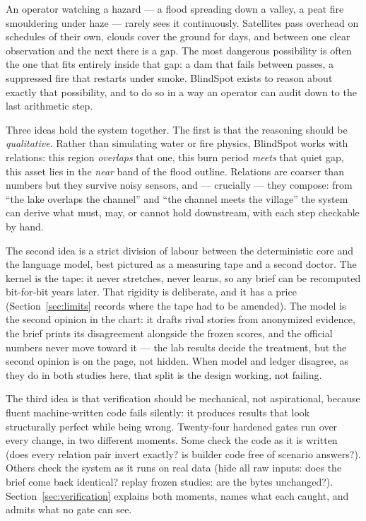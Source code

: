 \documentclass[11pt]{article}
\begin{document}
An operator watching a hazard --- a flood spreading down a valley, a peat fire
smouldering under haze --- rarely sees it continuously. Satellites pass
overhead on schedules of their own, clouds cover the ground for days, and
between one clear observation and the next there is a gap. The most dangerous
possibility is often the one that fits entirely inside that gap: a dam that
fails between passes, a suppressed fire that restarts under smoke. BlindSpot
exists to reason about exactly that possibility, and to do so in a way an
operator can audit down to the last arithmetic step.

Three ideas hold the system together. The first is that the reasoning should
be \emph{qualitative}. Rather than simulating water or fire physics, BlindSpot
works with relations: this region \emph{overlaps} that one, this burn period
\emph{meets} that quiet gap, this asset lies in the \emph{near} band of the
flood outline. Relations are coarser than numbers but they survive noisy
sensors, and --- crucially --- they compose: from ``the lake overlaps the
channel'' and ``the channel meets the village'' the system can derive what
must, may, or cannot hold downstream, with each step checkable by hand.

The second idea is a strict division of labour between the deterministic core
and the language model, best pictured as a measuring tape and a second doctor.
The kernel is the tape: it never stretches, never learns, so any brief can be
recomputed bit-for-bit years later. That rigidity is deliberate, and it has a
price (Section~\ref{sec:limits} records where the tape had to be amended).
The model is the second opinion in the chart: it drafts rival stories from
anonymized evidence, the brief prints its disagreement alongside the frozen
scores, and the official numbers never move toward it --- the lab results
decide the treatment, but the second opinion is on the page, not hidden. When
model and ledger disagree, as they do in both studies here, that split is the
design working, not failing.

The third idea is that verification should be mechanical, not aspirational,
because fluent machine-written code fails silently: it produces results that
look structurally perfect while being wrong. Twenty-four hardened gates run
over every change, in two different moments. Some check the code as it is
written (does every relation pair invert exactly? is builder code free of
scenario answers?). Others check the system as it runs on real data (hide all
raw inputs: does the brief come back identical? replay frozen studies: are
the bytes unchanged?). Section~\ref{sec:verification} explains both moments,
names what each caught, and admits what no gate can see.
\end{document}

